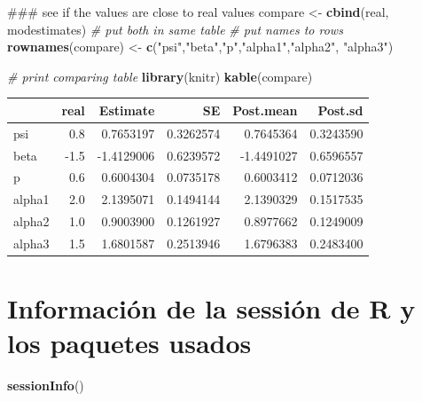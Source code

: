 \documentclass[]{book}
\newenvironment{Shaded}{\begin{snugshade}}{\end{snugshade}}
\newcommand{\KeywordTok}[1]{\textcolor[rgb]{0.13,0.29,0.53}{\textbf{{#1}}}}
\newcommand{\StringTok}[1]{\textcolor[rgb]{0.31,0.60,0.02}{{#1}}}
\newcommand{\CommentTok}[1]{\textcolor[rgb]{0.56,0.35,0.01}{\textit{{#1}}}}
\newcommand{\NormalTok}[1]{{#1}}
\begin{document}
\begin{Shaded}
\begin{Highlighting}[]
\NormalTok{### see if the values are close to real values}
\NormalTok{compare <-}\StringTok{ }\KeywordTok{cbind}\NormalTok{(real, modestimates) }\CommentTok{# put both in same table}
\CommentTok{# put names to rows}
\KeywordTok{rownames}\NormalTok{(compare) <-}\StringTok{ }\KeywordTok{c}\NormalTok{(}\StringTok{"psi"}\NormalTok{,}\StringTok{"beta"}\NormalTok{,}\StringTok{"p"}\NormalTok{,}\StringTok{"alpha1"}\NormalTok{,}\StringTok{"alpha2"}\NormalTok{, }\StringTok{"alpha3"}\NormalTok{)}

\CommentTok{# print comparing table}
\KeywordTok{library}\NormalTok{(knitr)}
\KeywordTok{kable}\NormalTok{(compare)}
\end{Highlighting}
\end{Shaded}

\begin{tabular}{l|r|r|r|r|r}
\hline
  & real & Estimate & SE & Post.mean & Post.sd\\
\hline
psi & 0.8 & 0.7653197 & 0.3262574 & 0.7645364 & 0.3243590\\
\hline
beta & -1.5 & -1.4129006 & 0.6239572 & -1.4491027 & 0.6596557\\
\hline
p & 0.6 & 0.6004304 & 0.0735178 & 0.6003412 & 0.0712036\\
\hline
alpha1 & 2.0 & 2.1395071 & 0.1494144 & 2.1390329 & 0.1517535\\
\hline
alpha2 & 1.0 & 0.9003900 & 0.1261927 & 0.8977662 & 0.1249009\\
\hline
alpha3 & 1.5 & 1.6801587 & 0.2513946 & 1.6796383 & 0.2483400\\
\hline
\end{tabular}

\chapter{Información de la sessión de R y los paquetes
usados}\label{informacion-de-la-session-de-r-y-los-paquetes-usados}

\begin{Shaded}
\begin{Highlighting}[]
\KeywordTok{sessionInfo}\NormalTok{()}
\end{Highlighting}
\end{Shaded}
\end{document}
